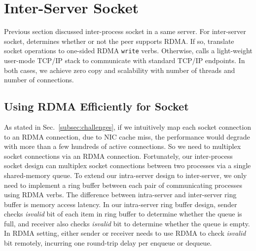 \section{Inter-Server Socket}
\label{sec:rdma}

Previous section discussed inter-process socket in a same server. For inter-server socket, \libipc{} determines whether or not the peer supports RDMA. If so, \libipc{} translate socket operations to one-sided RDMA \texttt{write} verbs. Otherwise, \libipc{} calls a light-weight user-mode TCP/IP stack to communicate with standard TCP/IP endpoints. In both cases, we achieve zero copy and scalability with number of threads and number of connections.

\subsection{Using RDMA Efficiently for Socket}

As stated in Sec.~\ref{subsec:challenges}, if we intuitively map each socket connection to an RDMA connection, due to NIC cache miss, the performance would degrade with more than a few hundreds of active connections. So we need to multiplex socket connections via an RDMA connection. %
Fortunately, our inter-process socket design can multiplex socket connections between two processes via a single shared-memory queue. %
To extend our intra-server design to inter-server, we only need to implement a ring buffer between each pair of communicating processes using RDMA verbs. The difference between intra-server and inter-server ring buffer is memory access latency. In our intra-server ring buffer design, sender checks \textit{isvalid} bit of each item in ring buffer to determine whether the queue is full, and receiver also checks \textit{isvalid} bit to determine whether the queue is empty. In RDMA setting, either sender or receiver needs to use RDMA to check \textit{isvalid} bit remotely, incurring one round-trip delay per enqueue or dequeue.

